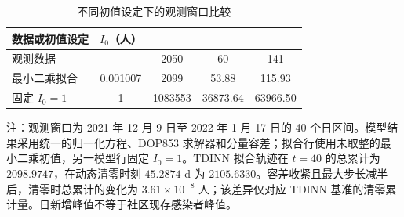 \documentclass[lang=cn,a4paper,newtx]{elegantpaper}
\renewcommand{\arraystretch}{1.25}
\begin{document}
\clearpage
\begin{table}[htbp]
\centering\small
\setlength{\tabcolsep}{3.5pt}
\renewcommand{\arraystretch}{1.25}
\begin{threeparttable}
\caption{不同初值设定下的观测窗口比较}
\label{tab:sup:initial}
\begin{tabular*}{\linewidth}{@{\extracolsep{\fill}}lS[table-format=1.6]S[table-format=7.0]S[table-format=5.2]S[table-format=5.2]@{}}
\toprule
数据或初值设定 & {$I_0$（人）} & {} & {} & {}\\
\midrule
观测数据 & {---} & 2050 & 60 & 141\\
最小二乘拟合 & 0.001007 & 2099 & 53.88 & 115.93\\
固定 $I_0=1$ & 1 & 1083553 & 36873.64 & 63966.50\\
\bottomrule
\end{tabular*}
\begin{tablenotes}[flushleft]\footnotesize
\item 注：观测窗口为 2021 年 12 月 9 日至 2022 年 1 月 17 日的 40 个日区间。模型结果采用统一的归一化方程、DOP853 求解器和分量容差；拟合行使用未取整的最小二乘初值，另一模型行固定 $I_0=1$。TDINN 拟合轨迹在 $t=40$ 的总累计为 $2098.9747$，在动态清零时刻 $45.2874$ d 为 $2105.6330$。容差收紧且最大步长减半后，清零时总累计的变化为 $3.61\times10^{-8}$ 人；该差异仅对应 TDINN 基准的清零累计量。日新增峰值不等于社区现存感染者峰值。
\end{tablenotes}
\end{threeparttable}
\end{table}
\clearpage
\end{document}
